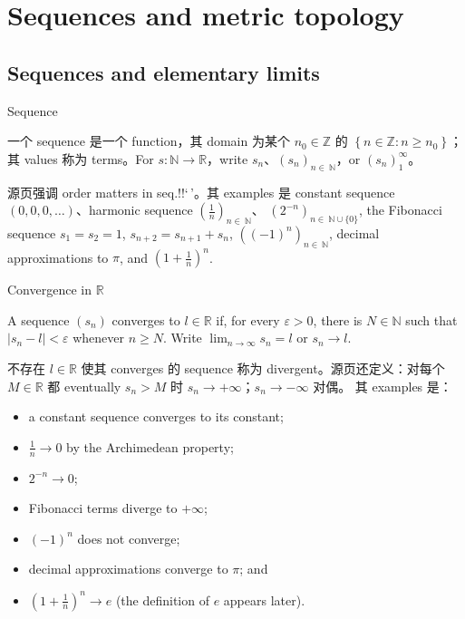 \chapter{Sequences and metric topology}

\section{Sequences and elementary limits}

\begin{definition}{Sequence}

一个 sequence 是一个 function，其 domain 为某个 \(n_{0} \in \mathbb{Z}\) 的 \(\left\{ {n \in \mathbb{Z}:n \geq n_{0}} \right\}\)；其 values 称为 terms。For \(s:\mathbb{N}\rightarrow\mathbb{R}\)，write \(s_{n}\)、\(\left( s_{n} \right)_{n \in \ \mathbb{N}}\)，or \(\left( s_{n} \right)_{1}^{\infty}\)。

\end{definition}

源页强调 order matters in seq.!!{\kern0pt}`\,'。其 examples 是 constant sequence \(\left( {0,0,0,\ldots} \right)\)、harmonic sequence \(\left( \frac{1}{n} \right)_{n \in \ \mathbb{N}}\)、 \(\left( 2^{- n} \right)_{n \in \ \mathbb{N} \cup {\{ 0\}}}\), the Fibonacci sequence \(s_{1} = s_{2} = 1\), \(s_{n + 2} = s_{n + 1} + s_{n}\), \(\left( \left( {- 1} \right)^{n} \right)_{n \in \ \mathbb{N}}\), decimal approximations to \(\pi\), and \(\left( {1 + \frac{1}{n}} \right)^{n}\).

\begin{definition}{Convergence in \(\mathbb{R}\)}

A sequence \(\left( s_{n} \right)\) converges to \(l \in \mathbb{R}\) if, for every \(\varepsilon > 0\), there is \(N \in \mathbb{N}\) such that \(\left| {s_{n} - l} \right| < \varepsilon\) whenever \(n \geq N\). Write \(\lim_{n\rightarrow\infty}s_{n} = l\) or \(s_{n}\rightarrow l\).

\end{definition}

不存在 \(l \in \mathbb{R}\) 使其 converges 的 sequence 称为 divergent。源页还定义：对每个 \(M \in \mathbb{R}\) 都 eventually \(s_{n} > M\) 时 \(s_{n}\rightarrow + \infty\)；\(s_{n}\rightarrow - \infty\) 对偶。 其 examples 是：

\begin{itemize}
\tightlist
\item
  a constant sequence converges to its constant;
\item
  \(\frac{1}{n}\rightarrow 0\) by the Archimedean property;
\item
  \(2^{- n}\rightarrow 0\);
\item
  Fibonacci terms diverge to \(+ \infty\);
\item
  \(\left( {- 1} \right)^{n}\) does not converge;
\item
  decimal approximations converge to \(\pi\); and
\item
  \(\left( {1 + \frac{1}{n}} \right)^{n}\rightarrow e\) (the definition of \(e\) appears later).
\end{itemize}

